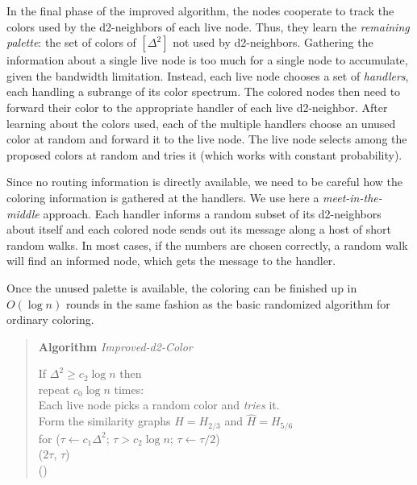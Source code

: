 In the final phase of the improved algorithm, the nodes cooperate to track the colors used by the d2-neighbors of each live node. Thus, they learn the \emph{remaining palette}: the set of colors of $[\Delta^2]$ not used by d2-neighbors. Gathering the information about a single live node is too much for a single node to accumulate, given the bandwidth limitation. Instead, each live node chooses a set of \emph{handlers}, each handling a subrange of its color spectrum. The colored nodes then need to forward their color to the appropriate handler of each live d2-neighbor. After learning about the colors used, each of the multiple handlers choose an unused color at random and forward it to the live node. The live node selects among the proposed colors at random and tries it (which works with constant probability).

Since no routing information is directly available, we need to be careful how the coloring information is gathered at the handlers. We use here a \emph{meet-in-the-middle} approach. Each handler informs a random subset of its d2-neighbors about itself and each colored node sends out its message along a host of short random walks. In most cases, if the numbers are chosen correctly, a random walk will find an informed node, which gets the message to the handler. 

Once the unused palette is available, the coloring can be finished up in $O(\log n)$ rounds in the same fashion as the basic randomized {\congest} algorithm for ordinary coloring.

\begin{quote}
   \textbf{Algorithm} \emph{Improved-d2-Color}

   If $\Delta^2 \ge c_2\log n$ then  \\
   \hspace*{2em} repeat $c_0 \log n$ times: \\
   \hspace*{4em} Each live node picks a random color and \emph{tries} it. \\     
   \hspace*{2em} Form the similarity graphs $H=H_{2/3}$ and $\hat{H} = H_{5/6}$ \\
   \hspace*{2em} for ($\tau \leftarrow c_1 \Delta^2$; $\tau > c_2\log n$; $\tau \leftarrow \tau/2$) \\
   \hspace*{4em}      ($2 \tau$, $\tau$) \\
    () \\
\end{quote}

